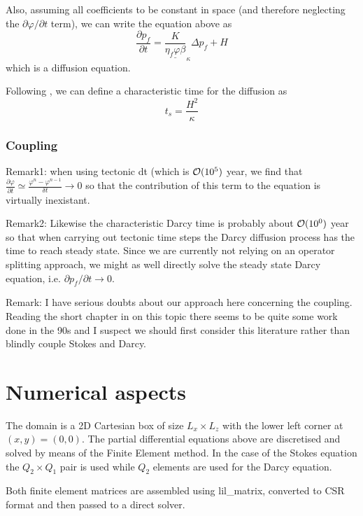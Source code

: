 \documentclass[a4paper]{article}
\newcommand{\python}{\color{darkgray} \sffamily }
\begin{document}
Also, assuming all coefficients to be constant in space (and 
therefore neglecting the $\partial\varphi/\partial t$ term), we can write the 
equation above as
\[
\frac{\partial p_f}{\partial t}
= \underline{\frac{K}{\eta_f \varphi \beta}}_{\kappa}  \Delta  p_f  + H
\]
which is a diffusion equation.

Following \textcite{wanu84}, we can define a characteristic time for the diffusion
as 
\[
t_s = \frac{H^2}{\kappa}
\]




\subsubsection{Coupling}

Remark1: 
when using tectonic dt (which is ${\cal{O}}(10^5)$ year, 
we find that $\frac{\partial \varphi}{\partial t}
\simeq \frac{\varphi^n -\varphi^{n-1}}{\delta t } \rightarrow 0$
so that the contribution of this term to the equation is 
virtually inexistant.

Remark2: Likewise the characteristic Darcy time is probably 
about ${\cal{O}}(10^0)$ year so that when carrying out 
tectonic time steps the Darcy diffusion process has the time 
to reach steady state. Since we are currently not
relying on an operator splitting approach, we might as well
directly solve the steady state Darcy equation, i.e.
$\partial p_f/\partial t \rightarrow 0$. 


Remark: I have serious doubts about our approach here 
concerning the coupling. Reading the short chapter in 
\textcite{tack10} on this topic there seems to be quite some 
work done in the 90s and I suspect we should first 
consider this literature rather than blindly couple 
Stokes and Darcy. 


\newpage
\section{Numerical aspects}

The domain is a 2D Cartesian box of size $L_x \times L_z$
with the lower left corner at $(x,y)=(0,0)$.
The partial differential equations above are discretised and
solved by means of the Finite Element method.
In the case of the Stokes equation the $Q_2\times Q_1$ 
pair is used \textcite{thba22} while $Q_2$
elements are used for the Darcy equation.

Both finite element matrices are assembled using {\python lil\_matrix},
converted to CSR format and then passed to a direct solver.
\end{document}

